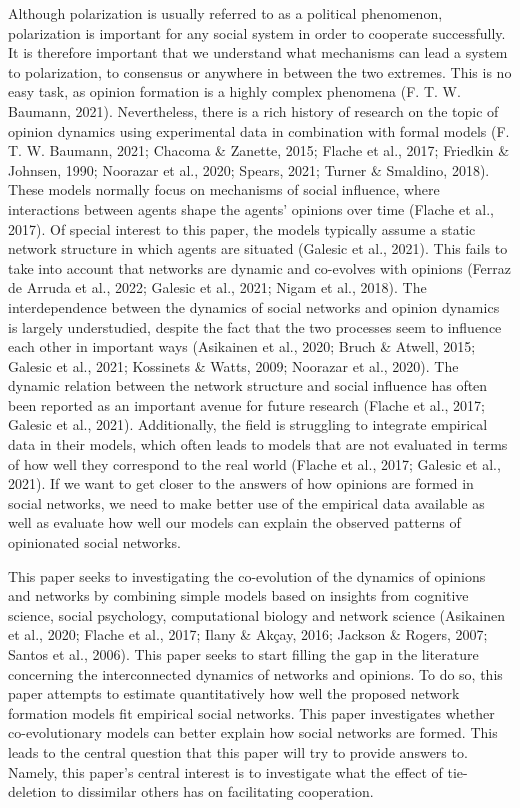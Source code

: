 \documentclass{article}
\begin{document}
Although polarization is usually referred to as a political phenomenon, polarization is important for any social system in order to cooperate successfully. It is therefore important that we understand what mechanisms can lead a system to polarization, to consensus or anywhere in between the two extremes. This is no easy task, as opinion formation is a highly complex phenomena (F. T. W. Baumann, 2021). Nevertheless, there is a rich history of research on the topic of opinion dynamics using experimental data in combination with formal models (F. T. W. Baumann, 2021; Chacoma \& Zanette, 2015; Flache et al., 2017; Friedkin \& Johnsen, 1990; Noorazar et al., 2020; Spears, 2021; Turner \& Smaldino, 2018). These models normally focus on mechanisms of social influence, where interactions between agents shape the agents’ opinions over time (Flache et al., 2017). Of special interest to this paper, the models typically assume a static network structure in which agents are situated (Galesic et al., 2021). This fails to take into account that networks are dynamic and co-evolves with opinions (Ferraz de Arruda et al., 2022; Galesic et al., 2021; Nigam et al., 2018). The interdependence between the dynamics of social networks and opinion dynamics is largely understudied, despite the fact that the two processes seem to influence each other in important ways (Asikainen et al., 2020; Bruch \& Atwell, 2015; Galesic et al., 2021; Kossinets \& Watts, 2009; Noorazar et al., 2020). The dynamic relation between the network structure and social influence has often been reported as an important avenue for future research (Flache et al., 2017; Galesic et al., 2021). Additionally, the field is struggling to integrate empirical data in their models, which often leads to models that are not evaluated in terms of how well they correspond to the real world (Flache et al., 2017; Galesic et al., 2021). If we want to get closer to the answers of how opinions are formed in social networks, we need to make better use of the empirical data available as well as evaluate how well our models can explain the observed patterns of opinionated social networks. 

This paper seeks to investigating the co-evolution of the dynamics of opinions and networks by combining simple models based on insights from cognitive science, social psychology, computational biology and network science (Asikainen et al., 2020; Flache et al., 2017; Ilany \& Akçay, 2016; Jackson \& Rogers, 2007; Santos et al., 2006). This paper seeks to start filling the gap in the literature concerning the interconnected dynamics of networks and opinions. To do so, this paper attempts to estimate quantitatively how well the proposed network formation models fit empirical social networks. This paper investigates whether co-evolutionary models can better explain how social networks are formed. This leads to the central question that this paper will try to provide answers to. Namely, this paper’s central interest is to investigate what the effect of tie-deletion to dissimilar others has on facilitating cooperation. 
\end{document}
